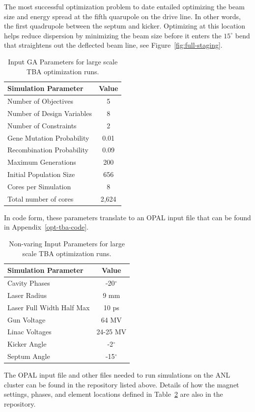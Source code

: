 \label{setup}
The most successful optimization problem to date entailed optimizing the 
beam size and energy spread at the fifth quarupole on the drive line.
In other words, the first quadrupole between the septum and kicker.
Optimizing at this location helps reduce dispersion by minimizing 
the beam size before it enters the $15^\circ$ bend that straightens out 
the deflected beam line, see Figure~\ref{fig:full-staging}.
\begin{table}%
	\begin{center}
		\caption{Input GA Parameters for large scale TBA optimization runs.}
		\label{tab:opt-tba}
		\begin{tabular}{lc}
			\toprule
			\toprule
			\textbf{Simulation Parameter} 	&  \textbf{Value} \\ 
			\midrule
			{Number of Objectives}			&  5 \\
			Number of Design Variables		&  8 \\
			Number of Constraints			&  2 \\
			{Gene Mutation Probability} 	&  0.01\\ 
			{Recombination Probability} 	&  0.09 \\
			{Maximum  Generations}			&  200 \\
			{Initial  Population Size}		&  656\\ 
			Cores per Simulation 			&  8 \\
			Total number of cores			& 2,624  \\
			\bottomrule
		\end{tabular}
	\end{center}
\end{table}
In code form, these parameters translate to an OPAL input file that 
can be found in Appendix~\ref{opt-tba-code}.
\begin{table}%
	\begin{center}
		\caption{Non-varing Input Parameters for large scale TBA optimization runs.}
		\label{tab:variables}
		\begin{tabular}{lc}
			\toprule
			\toprule
			\textbf{Simulation Parameter} 	&  \textbf{Value} \\ 
			\midrule
			Cavity Phases		&  -20$^\circ$ \\
			Laser Radius		& 9 mm \\
			Laser Full Width Half Max	& 10 ps \\
			Gun Voltage 				& 64 MV\\ 
			Linac Voltages 				& 24-25 MV \\
			Kicker Angle				& -2$^\circ$ \\
			Septum Angle				& -15$^\circ$\\ 
			\bottomrule
		\end{tabular}
	\end{center}
\end{table}
The OPAL input file and other files needed to run simulations on the ANL cluster 
can be found in the repository listed above.
Details of how the magnet settings, phases, and element locations defined 
in Table~\ref{tab:variables} are also in the repository.


